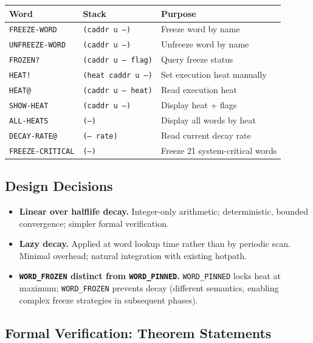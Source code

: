 \begin{center}
\begin{tabular}{lll}
\toprule
Word & Stack & Purpose \\
\midrule
\texttt{FREEZE-WORD}    & \texttt{(caddr u --)}     & Freeze word by name \\
\texttt{UNFREEZE-WORD}  & \texttt{(caddr u --)}     & Unfreeze word by name \\
\texttt{FROZEN?}        & \texttt{(caddr u -- flag)} & Query freeze status \\
\texttt{HEAT!}          & \texttt{(heat caddr u --)} & Set execution heat manually \\
\texttt{HEAT@}          & \texttt{(caddr u -- heat)} & Read execution heat \\
\texttt{SHOW-HEAT}      & \texttt{(caddr u --)}     & Display heat + flags \\
\texttt{ALL-HEATS}      & \texttt{(--)}             & Display all words by heat \\
\texttt{DECAY-RATE@}    & \texttt{(-- rate)}        & Read current decay rate \\
\texttt{FREEZE-CRITICAL} & \texttt{(--)}            & Freeze 21 system-critical words \\
\bottomrule
\end{tabular}
\end{center}

\subsection{Design Decisions}

\begin{itemize}
  \item \textbf{Linear over halflife decay.} Integer-only arithmetic;
    deterministic, bounded convergence; simpler formal verification.
  \item \textbf{Lazy decay.} Applied at word lookup time rather than by
    periodic scan. Minimal overhead; natural integration with existing
    hotpath.
  \item \textbf{\texttt{WORD\_FROZEN} distinct from \texttt{WORD\_PINNED}.}
    \texttt{WORD\_PINNED} locks heat at maximum; \texttt{WORD\_FROZEN}
    prevents decay (different semantics, enabling complex freeze strategies
    in subsequent phases).
\end{itemize}

\subsection{Formal Verification: Theorem Statements}

